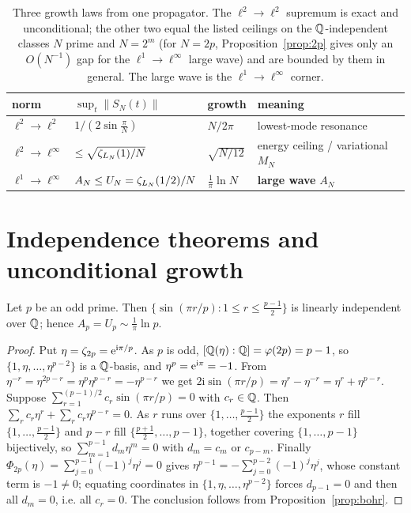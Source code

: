 \begin{table}[ht]\centering
\begin{tabular}{llll}
\toprule
norm & $\sup_t\|S_N(t)\|$ & growth & meaning \\
\midrule
$\ell^2\!\to\!\ell^2$ & $1/(2\sin\tfrac\pi N)$ & $N/2\pi$ & lowest-mode resonance \\
$\ell^2\!\to\!\ell^\infty$ & $\le\sqrt{\zeta_{L_N}(1)/N}$ & $\sqrt{N/12}$ & energy ceiling / variational $M_N$ \\
$\ell^1\!\to\!\ell^\infty$ & $A_N\le U_N=\zeta_{L_N}(1/2)/N$ & $\tfrac1\pi\ln N$ & \textbf{large wave} $A_N$ \\
\bottomrule
\end{tabular}
\caption{Three growth laws from one propagator. The $\ell^2\!\to\!\ell^2$ supremum is exact and
unconditional; the other two equal the listed ceilings on the $\mathbb{Q}$-independent classes $N$ prime and
$N=2^m$ (for $N=2p$, Proposition~\ref{prop:2p} gives only an $O(N^{-1})$ gap for the
$\ell^1\!\to\!\ell^\infty$ large wave) and are bounded by them in general. The large wave is the
$\ell^1\!\to\!\ell^\infty$ corner.}\label{tab:opnorm}
\end{table}

\section{Independence theorems and unconditional growth}\label{sec:prime}

\begin{theorem}\label{thm:prime}
Let $p$ be an odd prime. Then $\{\sin(\pi r/p):1\le r\le\tfrac{p-1}2\}$ is linearly independent
over $\mathbb{Q}$; hence $A_p=U_p\sim\tfrac1\pi\ln p$.
\end{theorem}

\begin{proof}
Put $\eta=\zeta_{2p}=\mathrm{e}^{\mathrm{i}\pi/p}$. As $p$ is odd, $[\mathbb{Q}(\eta):\mathbb{Q}]=\varphi(2p)=p-1$, so
$\{1,\eta,\dots,\eta^{p-2}\}$ is a $\mathbb{Q}$-basis, and $\eta^{p}=\mathrm{e}^{\mathrm{i}\pi}=-1$. From
$\eta^{-r}=\eta^{2p-r}=\eta^{p}\eta^{p-r}=-\eta^{p-r}$ we get $2\mathrm{i}\sin(\pi r/p)=\eta^r-\eta^{-r}=\eta^r+\eta^{p-r}$.
Suppose $\sum_{r=1}^{(p-1)/2}c_r\sin(\pi r/p)=0$ with $c_r\in\mathbb{Q}$. Then
$\sum_r c_r\eta^r+\sum_r c_r\eta^{p-r}=0$. As $r$ runs over $\{1,\dots,\tfrac{p-1}2\}$ the exponents
$r$ fill $\{1,\dots,\tfrac{p-1}2\}$ and $p-r$ fill $\{\tfrac{p+1}2,\dots,p-1\}$, together covering
$\{1,\dots,p-1\}$ bijectively, so $\sum_{m=1}^{p-1}d_m\eta^m=0$ with $d_m=c_m$ or $c_{p-m}$.
Finally $\Phi_{2p}(\eta)=\sum_{j=0}^{p-1}(-1)^j\eta^j=0$ gives $\eta^{p-1}=-\sum_{j=0}^{p-2}(-1)^j\eta^j$,
whose constant term is $-1\ne0$; equating coordinates in $\{1,\eta,\dots,\eta^{p-2}\}$ forces
$d_{p-1}=0$ and then all $d_m=0$, i.e. all $c_r=0$. The conclusion follows from
Proposition~\ref{prop:bohr}. \end{proof}

